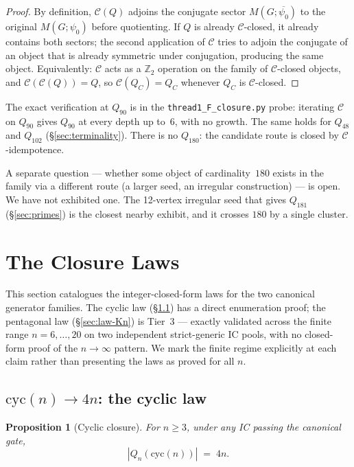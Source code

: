 \documentclass[12pt,a4paper]{article}
\newtheorem{proposition}[theorem]{Proposition}
\theoremstyle{definition}
\theoremstyle{remark}
\newcommand{\bZ}{\mathbb{Z}}
\newcommand{\Qn}{Q_n}
\newcommand{\Ccls}{\mathcal{C}}             %
\newcommand{\cyc}{\mathrm{cyc}}
\begin{document}
\begin{proof}
By definition, $\Ccls(Q)$ adjoins the conjugate sector $M(G;
\overline{\psi_0})$ to the original $M(G; \psi_0)$ before quotienting.
If $Q$ is already $\Ccls$-closed, it already contains both sectors;
the second application of $\Ccls$ tries to adjoin the conjugate of an
object that is already symmetric under conjugation, producing the
same object. Equivalently: $\Ccls$ acts as a $\bZ_2$ operation on
the family of $\Ccls$-closed objects, and $\Ccls(\Ccls(Q)) = Q$, so
$\Ccls(Q_{C}) = Q_{C}$ whenever $Q_C$ is $\Ccls$-closed.
\end{proof}

The exact verification at $Q_{90}$ is in the
\texttt{thread1\_F\_closure.py} probe: iterating $\Ccls$ on $Q_{90}$
gives $Q_{90}$ at every depth up to~$6$, with no growth. The same
holds for $Q_{48}$ and $Q_{102}$ (\S\ref{sec:terminality}). There is
no $Q_{180}$: the candidate route is closed by $\Ccls$-idempotence.

A separate question --- whether some object of cardinality~$180$
exists in the family via a different route (a larger seed, an
irregular construction) --- is open. We have not exhibited one. The
12-vertex irregular seed that gives $Q_{181}$ (\S\ref{sec:primes})
is the closest nearby exhibit, and it crosses $180$ by a single
cluster.

\section{The Closure Laws}\label{sec:closure-laws}

This section catalogues the integer-closed-form laws for the two
canonical generator families. The cyclic law (\S\ref{sec:law-cyc}) has a
direct enumeration proof; the pentagonal law (\S\ref{sec:law-Kn}) is
Tier~3 --- exactly validated across the finite range $n = 6,\dots,20$ on
two independent strict-generic IC pools, with no closed-form proof of
the $n \to \infty$ pattern. We mark the finite regime explicitly at each
claim rather than presenting the laws as proved for all $n$.

\subsection{$\cyc(n) \to 4n$: the cyclic law}\label{sec:law-cyc}

\begin{proposition}[Cyclic closure]\label{prop:cyc-law}
For $n \ge 3$, under any IC passing the canonical gate,
\[
|\Qn(\cyc(n))| \;=\; 4n.
\]
\end{proposition}
\end{document}
